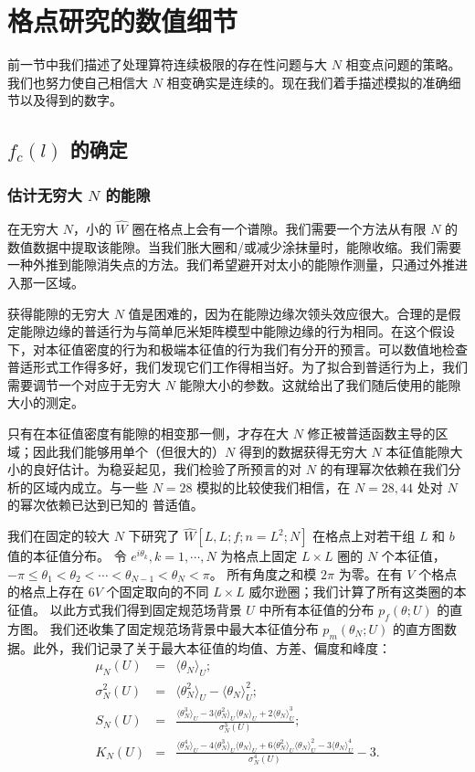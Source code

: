 \section{格点研究的数值细节}

前一节中我们描述了处理算符连续极限的存在性问题与大 $N$ 相变点问题的策略。我们也努力使自己相信大 $N$ 相变确实是连续的。现在我们着手描述模拟的准确细节以及得到的数字。

\subsection{$f_c(l)$ 的确定}

\subsubsection{估计无穷大 $N$ 的能隙}

在无穷大 $N$，小的 $\hat W$ 圈在格点上会有一个谱隙。我们需要一个方法从有限 $N$ 的数值数据中提取该能隙。当我们胀大圈和/或减少涂抹量时，能隙收缩。我们需要一种外推到能隙消失点的方法。我们希望避开对太小的能隙作测量，只通过外推进入那一区域。

获得能隙的无穷大 $N$ 值是困难的，因为在能隙边缘次领头效应很大。合理的是假定能隙边缘的普适行为与简单厄米矩阵模型中能隙边缘的行为相同。在这个假设下，对本征值密度的行为和极端本征值的行为我们有分开的预言。可以数值地检查普适形式工作得多好，我们发现它们工作得相当好。为了拟合到普适行为上，我们需要调节一个对应于无穷大 $N$ 能隙大小的参数。这就给出了我们随后使用的能隙大小的测定。

只有在本征值密度有能隙的相变那一侧，才存在大 $N$ 修正被普适函数主导的区域；因此我们能够用单个（但很大的）$N$ 得到的数据获得无穷大 $N$ 本征值能隙大小的良好估计。为稳妥起见，我们检验了所预言的对 $N$ 的有理幂次依赖在我们分析的区域内成立。与一些 $N=28$ 模拟的比较使我们相信，在 $N=28,44$ 处对 $N$ 的幂次依赖已达到已知的
普适值。

我们在固定的较大 $N$ 下研究了 $\hat W [L , L ; f;
n=L^2;N]$ 在格点上对若干组 $L$ 和 $b$ 值的本征值分布。
令 $e^{i\theta_k}, k=1,\cdots,N$ 为格点上固定 $L\times L$ 圈的 $N$ 个本征值，$-\pi \le \theta_1 <
\theta_2 < \cdots < \theta_{N-1} < \theta_N < \pi$。
所有角度之和模 $2\pi$ 为零。在有 $V$
个格点的格点上存在 $6V$ 个固定取向的不同 $L\times L$ 威尔逊圈；我们计算了所有这类圈的本征值。
以此方式我们得到固定规范场背景 $U$ 中所有本征值的分布
$p_f(\theta;U)$ 的直方图。
我们还收集了固定规范场背景中最大本征值分布
$p_m(\theta_N;U)$ 的直方图数据。此外，我们记录了关于最大本征值的均值、方差、偏度和峰度：
\begin{eqnarray}
\mu_N(U) &=& \langle \theta_N \rangle_U;\nonumber\\
\sigma^2_N(U) &=& \langle \theta^2_N \rangle_U - \langle
\theta_N \rangle^2_U;\nonumber\\[0.6em]
S_N(U) &=&
\frac{ \langle \theta^3_N \rangle_U
-3 \langle \theta^2_N \rangle_U \langle \theta_N \rangle_U
+ 2 \langle \theta_N \rangle^3_U }{\sigma^3_N(U)};\nonumber\\[0.6em]
K_N(U) &=&
\frac{ \langle \theta^4_N \rangle_U
-4 \langle \theta^3_N \rangle_U \langle \theta_N \rangle_U
+6 \langle \theta^2_N \rangle_U \langle \theta_N \rangle^2_U
-3 \langle \theta_N \rangle^4_U }{\sigma^4_N(U)}-3.
\end{eqnarray}

